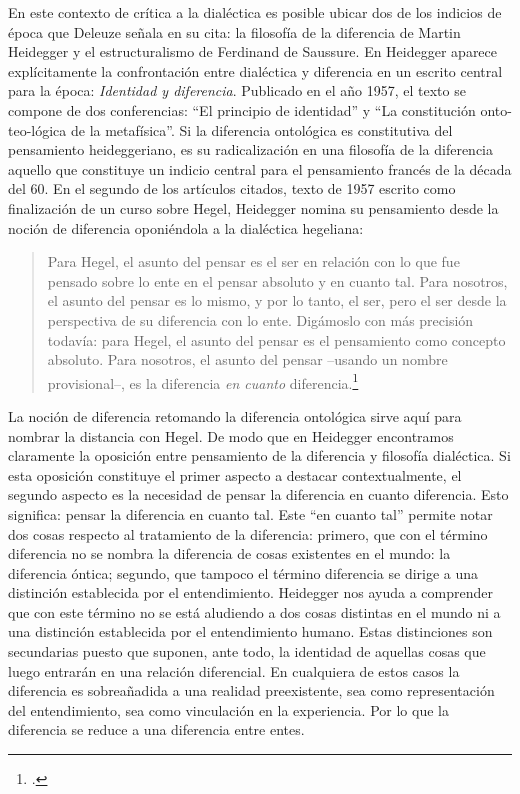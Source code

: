 \documentclass{book}
\begin{document}
En este contexto de crítica a la dialéctica es posible ubicar dos de los
indicios de época que Deleuze señala en su cita: la filosofía de la
diferencia de Martin Heidegger y el estructuralismo de Ferdinand de
Saussure. En Heidegger aparece explícitamente la confrontación entre
dialéctica y diferencia en un escrito central para la época:
\emph{Identidad y diferencia}. Publicado en el año 1957, el texto se
compone de dos conferencias: \enquote{El principio de identidad} y \enquote{La
constitución onto-teo-lógica de la metafísica}. Si la diferencia
ontológica es constitutiva del pensamiento heideggeriano, es su
radicalización en una filosofía de la diferencia aquello que constituye
un indicio central para el pensamiento francés de la década del 60. En
el segundo de los artículos citados, texto de 1957 escrito como
finalización de un curso sobre Hegel, Heidegger nomina su pensamiento
desde la noción de diferencia oponiéndola a la dialéctica hegeliana:

\begin{quote}
Para Hegel, el asunto del pensar es el ser en relación con lo que fue
pensado sobre lo ente en el pensar absoluto y en cuanto tal. Para
nosotros, el asunto del pensar es lo mismo, y por lo tanto, el ser, pero
el ser desde la perspectiva de su diferencia con lo ente. Digámoslo con
más precisión todavía: para Hegel, el asunto del pensar es el
pensamiento como concepto absoluto. Para nosotros, el asunto del pensar
--usando un nombre provisional--, es la diferencia \emph{en cuanto}
diferencia.\footcite[107]{heidegger1988}
\end{quote}

La noción de diferencia retomando la diferencia ontológica sirve aquí
para nombrar la distancia con Hegel. De modo que en Heidegger
encontramos claramente la oposición entre pensamiento de la diferencia y
filosofía dialéctica. Si esta oposición constituye el primer aspecto a
destacar contextualmente, el segundo aspecto es la necesidad de pensar
la diferencia en cuanto diferencia. Esto significa: pensar la diferencia
en cuanto tal. Este \enquote{en cuanto tal} permite notar dos cosas respecto al
tratamiento de la diferencia: primero, que con el término diferencia no
se nombra la diferencia de cosas existentes en el mundo: la diferencia
óntica; segundo, que tampoco el término diferencia se dirige a una
distinción establecida por el entendimiento. Heidegger nos ayuda a
comprender que con este término no se está aludiendo a dos cosas
distintas en el mundo ni a una distinción establecida por el
entendimiento humano. Estas distinciones son secundarias puesto que
suponen, ante todo, la identidad de aquellas cosas que luego entrarán en
una relación diferencial. En cualquiera de estos casos la diferencia es
sobreañadida a una realidad preexistente, sea como representación del
entendimiento, sea como vinculación en la experiencia. Por lo que la
diferencia se reduce a una diferencia entre entes.
\end{document}
